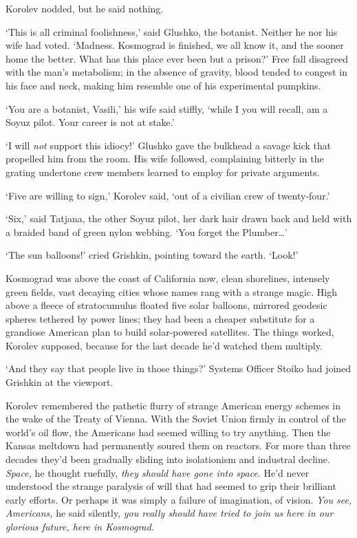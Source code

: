 Korolev nodded, but he said nothing.

`This is all criminal foolishness,' said Glushko, the botanist. Neither he nor his wife had voted. `Madness. Kosmograd is finished, we all know it, and the sooner home the better. What has this place ever been but a prison?' Free fall disagreed with the man's metabolism; in the absence of gravity, blood tended to congest in his face and neck, making him resemble one of his experimental pumpkins.

`You are a botanist, Vasili,' his wife said stiffly, `while I you will recall, am a Soyuz pilot. Your career is not at stake.'

`I will \textit{not} support this idiocy!' Glushko gave the bulkhead a savage kick that propelled him from the room. His wife followed, complaining bitterly in the grating undertone crew members learned to employ for private arguments.

`Five are willing to sign,' Korolev said, `out of a civilian crew of twenty-four.'

`Six,' said Tatjana, the other Soyuz pilot, her dark hair drawn back and held with a braided band of green nylon webbing. `You forget the Plumber\ldots'

`The sun balloons!' cried Grishkin, pointing toward the earth. `Look!'

Kosmograd was above the coast of California now, clean shorelines, intensely green fields, vast decaying cities whose names rang with a strange magic. High above a fleece of stratocumulus floated five solar balloons, mirrored geodesic spheres tethered by power lines; they had been a cheaper substitute for a grandiose American plan to build solar-powered satellites. The things worked, Korolev supposed, because for the last decade he'd watched them multiply.

`And they say that people live in those things?' Systems Officer Stoiko had joined Grishkin at the viewport.

Korolev remembered the pathetic flurry of strange American energy schemes in the wake of the Treaty of Vienna. With the Soviet Union firmly in control of the world's oil flow, the Americans had seemed willing to try anything. Then the Kansas meltdown had permanently soured them on reactors. For more than three decades they'd been gradually sliding into isolationism and industral decline. \textit{Space,} he thought ruefully, \textit{they should have gone into space}. He'd never understood the strange paralysis of will that had seemed to grip their brilliant early efforts. Or perhaps it was simply a failure of imagination, of vision. \textit{You see, Americans,} he said silently, \textit{you really should have tried to join us here in our glorious future, here in Kosmograd}.


